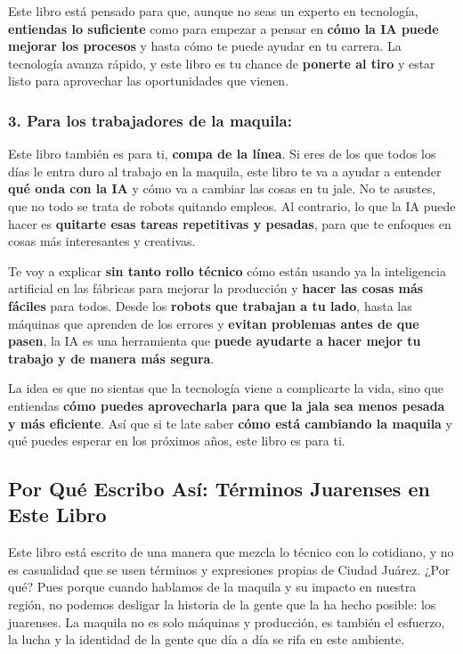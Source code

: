 \documentclass[
  10pt,
  letterpaper,
]{book}
\begin{document}
Este libro está pensado para que, aunque no seas un experto en
tecnología, \textbf{entiendas lo suficiente} como para empezar a pensar
en \textbf{cómo la IA puede mejorar los procesos} y hasta cómo te puede
ayudar en tu carrera. La tecnología avanza rápido, y este libro es tu
chance de \textbf{ponerte al tiro} y estar listo para aprovechar las
oportunidades que vienen.

\subsubsection*{3. Para los trabajadores de la
maquila:}\label{para-los-trabajadores-de-la-maquila}

Este libro también es para ti, \textbf{compa de la línea}. Si eres de
los que todos los días le entra duro al trabajo en la maquila, este
libro te va a ayudar a entender \textbf{qué onda con la IA} y cómo va a
cambiar las cosas en tu jale. No te asustes, que no todo se trata de
robots quitando empleos. Al contrario, lo que la IA puede hacer es
\textbf{quitarte esas tareas repetitivas y pesadas}, para que te
enfoques en cosas más interesantes y creativas.

Te voy a explicar \textbf{sin tanto rollo técnico} cómo están usando ya
la inteligencia artificial en las fábricas para mejorar la producción y
\textbf{hacer las cosas más fáciles} para todos. Desde los
\textbf{robots que trabajan a tu lado}, hasta las máquinas que aprenden
de los errores y \textbf{evitan problemas antes de que pasen}, la IA es
una herramienta que \textbf{puede ayudarte a hacer mejor tu trabajo y de
manera más segura}.

La idea es que no sientas que la tecnología viene a complicarte la vida,
sino que entiendas \textbf{cómo puedes aprovecharla para que la jala sea
menos pesada y más eficiente}. Así que si te late saber \textbf{cómo
está cambiando la maquila} y qué puedes esperar en los próximos años,
este libro es para ti.

\subsection*{Por Qué Escribo Así: Términos Juarenses en Este
Libro}\label{por-quuxe9-escribo-asuxed-tuxe9rminos-juarenses-en-este-libro}

Este libro está escrito de una manera que mezcla lo técnico con lo
cotidiano, y no es casualidad que se usen términos y expresiones propias
de Ciudad Juárez. ¿Por qué? Pues porque cuando hablamos de la maquila y
su impacto en nuestra región, no podemos desligar la historia de la
gente que la ha hecho posible: los juarenses. La maquila no es solo
máquinas y producción, es también el esfuerzo, la lucha y la identidad
de la gente que día a día se rifa en este ambiente.
\end{document}
